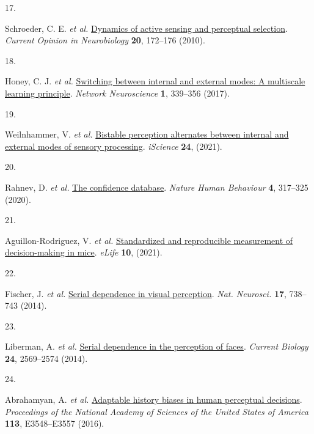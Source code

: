 \documentclass[
]{article}
\newlength{\cslhangindent}
\newlength{\csllabelwidth}
\newlength{\cslentryspacingunit} %
\newenvironment{CSLReferences}[2] %
 {%
  \setlength{\parindent}{0pt}
  \ifodd #1
  \let\oldpar\par
  \def\par{\hangindent=\cslhangindent\oldpar}
  \fi
  \setlength{\parskip}{#2\cslentryspacingunit}
 }%
 {}
\newcommand{\CSLLeftMargin}[1]{\parbox[t]{\csllabelwidth}{#1}}
\newcommand{\CSLRightInline}[1]{\parbox[t]{\linewidth - \csllabelwidth}{#1}\break}
\begin{document}
\begin{CSLReferences}{0}{0}
\leavevmode{}%
\CSLLeftMargin{17. }%
\CSLRightInline{Schroeder, C. E. \emph{et al.}
\href{https://doi.org/10.1016/j.conb.2010.02.010}{Dynamics of active
sensing and perceptual selection}. \emph{Current Opinion in
Neurobiology} \textbf{20}, 172--176 (2010).}

\leavevmode{}%
\CSLLeftMargin{18. }%
\CSLRightInline{Honey, C. J. \emph{et al.}
\href{https://doi.org/10.1162/netn_a_00024}{Switching between internal
and external modes: A multiscale learning principle}. \emph{Network
Neuroscience} \textbf{1}, 339--356 (2017).}

\leavevmode{}%
\CSLLeftMargin{19. }%
\CSLRightInline{Weilnhammer, V. \emph{et al.}
\href{https://doi.org/10.1016/j.isci.2021.102234}{Bistable perception
alternates between internal and external modes of sensory processing}.
\emph{iScience} \textbf{24}, (2021).}

\leavevmode{}%
\CSLLeftMargin{20. }%
\CSLRightInline{Rahnev, D. \emph{et al.}
\href{https://doi.org/10.1038/s41562-019-0813-1}{The confidence
database}. \emph{Nature Human Behaviour} \textbf{4}, 317--325 (2020).}

\leavevmode{}%
\CSLLeftMargin{21. }%
\CSLRightInline{Aguillon-Rodriguez, V. \emph{et al.}
\href{https://doi.org/10.7554/ELIFE.63711}{Standardized and reproducible
measurement of decision-making in mice}. \emph{eLife} \textbf{10},
(2021).}

\leavevmode{}%
\CSLLeftMargin{22. }%
\CSLRightInline{Fischer, J. \emph{et al.}
\href{https://doi.org/10.1038/nn.3689}{Serial dependence in visual
perception}. \emph{Nat. Neurosci.} \textbf{17}, 738--743 (2014).}

\leavevmode{}%
\CSLLeftMargin{23. }%
\CSLRightInline{Liberman, A. \emph{et al.}
\href{https://doi.org/10.1016/j.cub.2014.09.025}{Serial dependence in
the perception of faces}. \emph{Current Biology} \textbf{24}, 2569--2574
(2014).}

\leavevmode{}%
\CSLLeftMargin{24. }%
\CSLRightInline{Abrahamyan, A. \emph{et al.}
\href{https://doi.org/10.1073/pnas.1518786113}{Adaptable history biases
in human perceptual decisions}. \emph{Proceedings of the National
Academy of Sciences of the United States of America} \textbf{113},
E3548--E3557 (2016).}


\end{CSLReferences}
\end{document}

